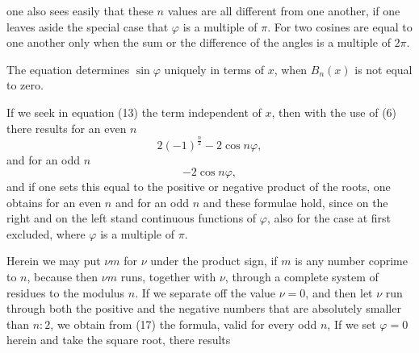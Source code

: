 one also sees easily that these $n$ values are all different from one another, if one leaves aside the special case that $\varphi$ is a multiple of $\pi$. For two cosines are equal to one another only when the sum or the difference of the angles is a multiple of $2\pi$.

The equation
determines $\sin\varphi$ uniquely in terms of $x$, when $B_n(x)$ is not equal to zero.

If we seek in equation (13) the term independent of $x$, then with the use of (6) there results for an even $n$
\[
2(-1)^{\frac{n}{2}} - 2\cos n\varphi,
\]
and for an odd $n$
\[
-2\cos n\varphi,
\]
and if one sets this equal to the positive or negative product of the roots, one obtains for an even $n$
and for an odd $n$
and these formulae hold, since on the right and on the left stand continuous functions of $\varphi$, also for the case at first excluded, where $\varphi$ is a multiple of $\pi$.

Herein we may put $\nu m$ for $\nu$ under the product sign, if $m$ is any number coprime to $n$, because then $\nu m$ runs, together with $\nu$, through a complete system of residues to the modulus $n$. If we separate off the value $\nu=0$, and then let $\nu$ run through both the positive and the negative numbers that are absolutely smaller than $n:2$, we obtain from (17) the formula, valid for every odd $n$,
If we set $\varphi = 0$ herein and take the square root, there results
